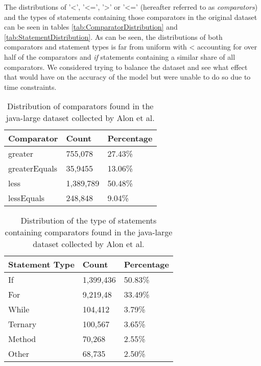 The distributions of '<', '<=', '>' or '<=' (hereafter referred to as \textit{comparators}) and the types of statements containing those comparators in the original dataset can be seen in tables \ref{tab:ComparatorDistribution} and \ref{tab:StatementDistribution}. As can be seen, the distributions of both comparators and statement types is far from uniform with < accounting for over half of the comparators and \textit{if} statements containing a similar share of all comparators. We considered trying to balance the dataset and see what effect that would have on the accuracy of the model but were unable to do so due to time constraints.

\begin{table}[]
\centering
\begin{tabular}{l|l|l}
\toprule
Comparator    & Count   & Percentage \\ 
\midrule
greater       & 755,078  & 27.43\%    \\ 
greaterEquals & 35,9455  & 13.06\%    \\ 
less          & 1,389,789 & 50.48\%    \\ 
lessEquals    & 248,848  & 9.04\%     \\ 
\bottomrule
\end{tabular}
\caption{Distribution of comparators found in the java-large dataset collected by Alon et al.\cite{code2seq}}
\end{table}
\label{tab:ComparatorDistribution}

\begin{table}[]
\centering
\begin{tabular}{l|l|l}
\toprule
Statement Type    & Count   & Percentage \\ 
\midrule
If             & 1,399,436 & 50.83\%    \\
For            & 9,219,48  & 33.49\%    \\
While          & 104,412  & 3.79\%     \\
Ternary        & 100,567  & 3.65\%     \\
Method         & 70,268   & 2.55\%     \\
Other          & 68,735   & 2.50\%     \\
\bottomrule
\end{tabular}
\caption{Distribution of the type of statements containing comparators found in the java-large dataset collected by Alon et al.\cite{code2seq}}
\end{table}
\label{tab:StatementDistribution}

